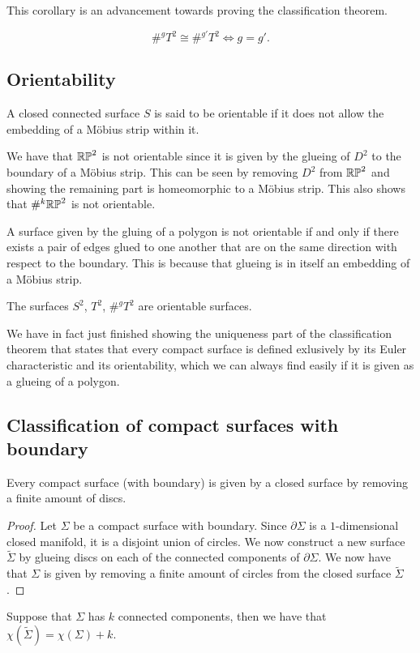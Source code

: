 \documentclass[11pt,a4paper]{article}
\begin{document}
This corollary is an advancement towards proving the classification theorem.

\begin{corollary}
  \[
    \#^g T^2 \cong \#^{g'} T^2 \iff g = g'.
  \]
\end{corollary}

\subsection{Orientability}
\begin{definition}
  A closed connected surface $S$ is said to be orientable if it does not allow
  the embedding of a M\"obius strip within it.
\end{definition}
\begin{example}
  We have that $\mathbb{RP}^2$ is not orientable since it is given by the glueing
  of $D^2$ to the boundary of a M\"obius strip.
  This can be seen by removing $D^2$ from $\mathbb{RP}^2$ and showing the remaining
  part is homeomorphic to a M\"obius strip.
  This also shows that $\#^{k} \mathbb{RP}^2$ is not orientable.
\end{example}
\begin{remark}
  A surface given by the gluing of a polygon is not orientable if and only
  if there exists a pair of edges glued to one another that are on the
  same direction with respect to the boundary.
  This is because that glueing is in itself an embedding of a M\"obius
  strip.
\end{remark}
\begin{corollary}
  The surfaces $S^2$, $T^2$, $\#^{g} T^2$ are orientable surfaces.
\end{corollary}

We have in fact just finished showing the uniqueness part of the classification
theorem that states that every compact surface is defined exlusively by
its Euler characteristic and its orientability, which we can always find
easily if it is given as a glueing of a polygon.

\subsection{Classification of compact surfaces with boundary}
\begin{proposition}
  Every compact surface (with boundary) is given by a closed surface
  by removing a finite amount of discs.
\end{proposition}
\begin{proof}
  Let $\Sigma$ be a compact surface with boundary.
  Since $\partial \Sigma$ is a $1$-dimensional closed manifold,
  it is a disjoint union of circles.
  We now construct a new surface $\widetilde \Sigma$ by glueing discs
  on each of the connected components of $\partial \Sigma$.
  We now have that $\Sigma$ is given by removing a finite amount of
  circles from the closed surface $\widetilde \Sigma$.
\end{proof}
\begin{remark}
  Suppose that $\Sigma$ has $k$ connected components, then we have that
  $\chi(\widetilde \Sigma) = \chi(\Sigma) + k$.
\end{remark}
\end{document}
